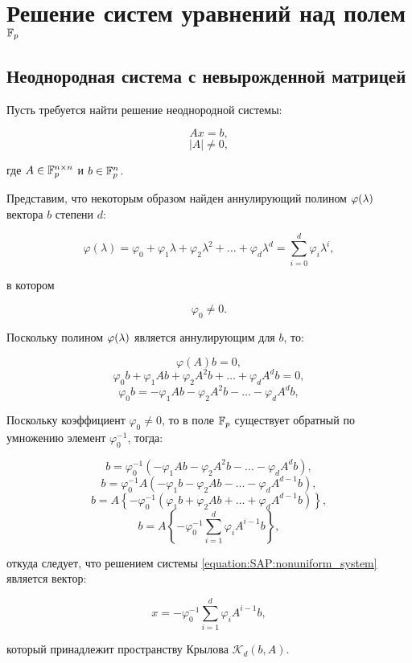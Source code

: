 \section{Решение систем уравнений над полем $\mathbb{F}_p$}

\subsection{Неоднородная система с невырожденной матрицей}\label{subsection:SAP:nonuniform}

Пусть требуется найти решение неоднородной системы:

	\begin{equation} \label{equation:SAP:nonuniform_system}
		A x = b,
	\end{equation}
	$$ \left| A \right| \neq 0, $$

где $A \in \mathbb{F}^{n \times n}_p$ и $b \in \mathbb{F}^{n}_p$.

Представим, что некоторым образом найден аннулирующий полином $\varphi (\lambda)$ вектора $b$ степени $d$:

	$$ \varphi(\lambda) =
		\varphi_0 + \varphi_1\lambda + \varphi_2\lambda^2 + \ldots + \varphi_d\lambda^d = \sum_{i=0}^d \varphi_i\lambda^i, $$

в котором

	$$ \varphi_0 \neq 0. $$

Поскольку полином $\varphi (\lambda)$ является аннулирующим для $b$, то:

	$$ \varphi(A)b = 0, $$
	$$ \varphi_0b + \varphi_1Ab + \varphi_2A^2b + \ldots + \varphi_dA^db = 0, $$
	$$ \varphi_0b = -\varphi_1Ab - \varphi_2A^2b - \ldots - \varphi_dA^db, $$

Поскольку коэффициент $ \varphi_0 \neq 0 $, то в поле $\mathbb{F}_p$ существует обратный по умножению элемент $\varphi_0^{-1}$, тогда:

	$$ b = \varphi_0^{-1} \left(-\varphi_1Ab - \varphi_2A^2b - \ldots - \varphi_dA^db \right), $$
	$$ b = \varphi_0^{-1} A \left(-\varphi_1b - \varphi_2Ab - \ldots - \varphi_dA^{d-1}b \right), $$
	$$ b = A \left\{ -\varphi_0^{-1} \left(\varphi_1b + \varphi_2Ab + \ldots + \varphi_dA^{d-1}b \right) \right\}, $$
	$$ b = A \left\{ -\varphi_0^{-1} \sum_{i=1}^d \varphi_iA^{i-1}b \right\}, $$

откуда следует, что решением системы \eqref{equation:SAP:nonuniform_system} является вектор:

	$$ x=-\varphi_0^{-1} \sum_{i=1}^d \varphi_iA^{i-1}b, $$

который принадлежит пространству Крылова $\mathcal K_d ( b, A)$.

